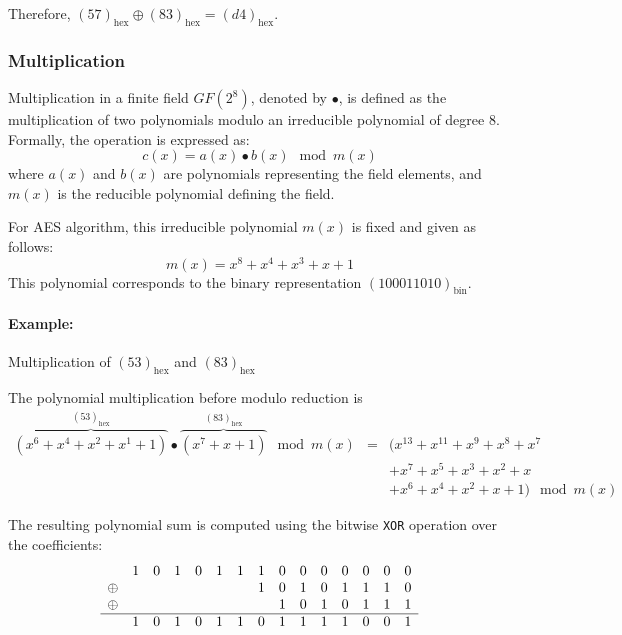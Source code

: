 Therefore, $(57)_{\text{hex}} \oplus (83)_{\text{hex}} = (d4)_{\text{hex}}$. 


\subsubsection{Multiplication}
\label{sec:multiplication}

Multiplication in a finite field $GF(2^8)$, denoted by $\bullet$, is defined as the multiplication of two polynomials modulo an irreducible polynomial of degree 8.
Formally, the operation is expressed as:
\begin{equation}
    c(x) = a(x) \bullet b(x) \mod m(x)
    \label{eq:mul}
\end{equation}
where $a(x)$ and $b(x)$ are polynomials representing the field elements, and $m(x)$ is the reducible polynomial defining the field.

For \gls{AES} algorithm, this irreducible polynomial $m(x)$ is fixed and given as follows:
\begin{equation}
    m(x) = x^8 + x^4 + x^3 + x + 1
\end{equation}
This polynomial corresponds to the binary representation $(100011010)_{\text{bin}}$.

\paragraph{Example:} Multiplication of $(53)_{\text{hex}}$ and $(83)_{\text{hex}}$

The polynomial multiplication before modulo reduction is
\[
\begin{array}{ccl}
    \overbrace{(x^6 + x^4 + x^2 + x^1 + 1)}^{(53)_{\text{hex}}} \bullet \overbrace{(x^7 + x + 1)}^{(83)_{\text{hex}}} \mod m(x) & = & (x^{13} + x^{11} + x^9 + x^8 + x^7\\
    && + x^7 + x^5 + x^3 + x^2 + x\\
    && + x^6 + x^4 + x^2 + x + 1 ) \mod m(x)
\end{array}
\]

The resulting polynomial sum is computed using the bitwise \texttt{XOR} operation over the coefficients:
\[
\begin{array}{ccccccccccccccc}
    &1&0&1&0&1&1&1&0&0&0&0&0&0&0\\
    \oplus &&&&&&&1&0&1&0&1&1&1&0\\
    \oplus &&&&&&&&1&0&1&0&1&1&1\\
    \hline
    &1&0&1&0&1&1&0&1&1&1&1&0&0&1
\end{array}
\]


